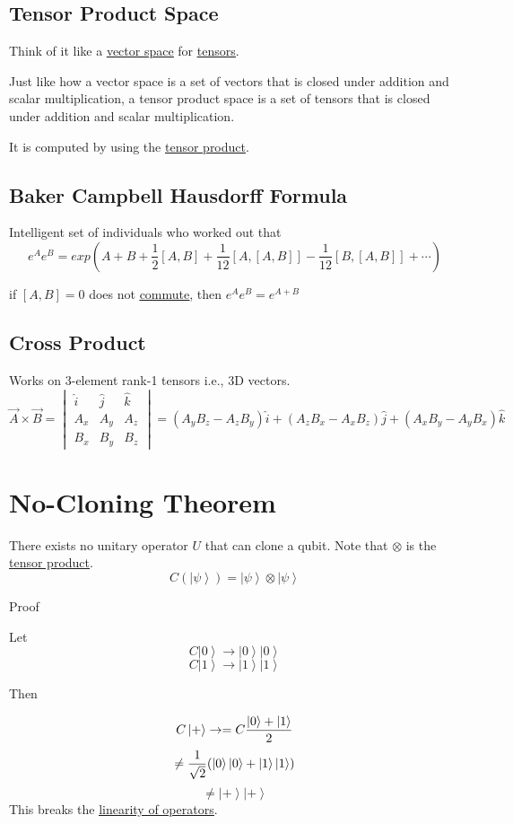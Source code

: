 \documentclass[
]{article}
\let\oldhyperref\hyperref
\renewcommand{\hyperref}[2][]{\oldhyperref[#1]{\underline{#2}}}
\providecommand{\ket}[1]{\left\lvert #1 \right\rangle}
\providecommand{\rarr}{\rightarrow}
\begin{document}
\subsection{Tensor Product Space}\label{tensor-product-space}
Think of it like a \hyperref[vector-spaces]{vector space} for \hyperref[tensor]{tensors}.

Just like how a vector space is a set of vectors that is closed under addition and scalar multiplication, a tensor product space is a set of tensors that is closed under addition and scalar multiplication.

It is computed by using the \hyperref[tensor-product]{tensor product}.


\subsection{Baker Campbell Hausdorff Formula}\label{baker-campbell-hausdorff-formula}

Intelligent set of individuals who worked out that
\[
	e^A e^B = exp(A+B+\frac{1}{2}[A,B]+\frac{1}{12}[A,[A,B]]-\frac{1}{12}[B,[A,B]]+\cdots)
\]

if $[A,B]=0$ does not \hyperref[commutators]{commute}, then $e^A e^B = e^{A+B}$
\subsection{Cross Product}\label{cross-product}
Works on 3-element rank-1 tensors i.e., 3D vectors.
\[
	\vec{A} \times \vec{B} = \begin{vmatrix} \hat{i} & \hat{j} & \hat{k} \\ A_x & A_y & A_z \\ B_x & B_y & B_z \end{vmatrix} = (A_y B_z - A_z B_y)\hat{i} + (A_z B_x - A_x B_z)\hat{j} + (A_x B_y - A_y B_x)\hat{k}
\]
\section{No-Cloning Theorem}\label{no-cloning-theorem}

There exists no unitary operator $U$ that can clone a qubit.
Note that $\otimes$ is the \hyperref[tensor-product]{tensor product}.
\[
	C(\ket{\psi})=\ket{\psi}\otimes\ket{\psi}
\]

Proof

Let
\[
	C\ket{0}\rarr \ket{0}\ket{0}
\]
\[
	C\ket{1}\rarr \ket{1}\ket{1}
\]

Then

\[
	C\ket{+}\rarr=C\frac{\ket{0}+\ket{1}}{2}\\
\]
\[
	\neq\frac{1}{\sqrt{2}}(\ket{0}\ket{0}+\ket{1}\ket{1})\\
\]
\[
	\neq \ket{+}\ket{+}
\]
This breaks the \hyperref[operators]{linearity of operators}.
\end{document}
